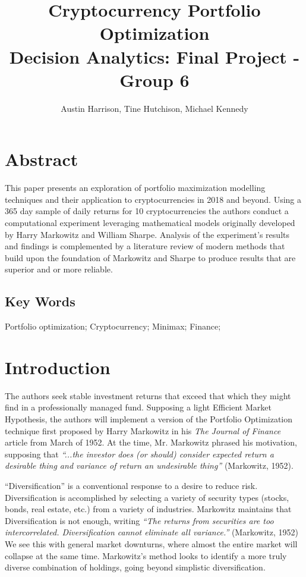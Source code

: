 \documentclass[11pt]{article} %
\title{Cryptocurrency Portfolio Optimization\\
\large Decision Analytics:  Final Project - Group 6}
\author{Austin Harrison, Tine Hutchison, Michael Kennedy}
\begin{document}
\maketitle


\section{Abstract}

This paper presents an exploration of portfolio maximization modelling techniques and their application to cryptocurrencies in 2018 and beyond.  Using a 365 day sample of daily returns for 10 cryptocurrencies the authors conduct a computational experiment leveraging mathematical models originally developed by Harry Markowitz and William Sharpe.  Analysis of the experiment’s results and findings is complemented by a literature review of modern methods that build upon the foundation of Markowitz and Sharpe to produce results that are superior and or more reliable.

\subsection{Key Words}

Portfolio optimization; Cryptocurrency; Minimax; Finance;

\section{Introduction}

The authors seek stable investment returns that exceed that which they might find in a professionally managed fund. Supposing a light Efficient Market Hypothesis, the authors will implement a version of the Portfolio Optimization technique first proposed by Harry Markowitz in his\emph{ The Journal of Finance} article from March of 1952. At the time, Mr. Markowitz phrased his motivation, supposing that\emph{ ``...the investor does (or should) consider expected return a desirable thing and variance of return an undesirable thing”} (Markowitz, 1952).

``Diversification” is a conventional response to a desire to reduce risk. Diversification is accomplished by selecting a variety of security types (stocks, bonds, real estate, etc.) from a variety of industries. Markowitz maintains that Diversification is not enough, writing \emph{``The returns from securities are too intercorrelated. Diversification cannot eliminate all variance.”} (Markowitz, 1952) We see this with general market downturns, where almost the entire market will collapse at the same time. Markowitz’s method looks to identify a more truly diverse combination of holdings, going beyond simplistic diversification.
\end{document}
